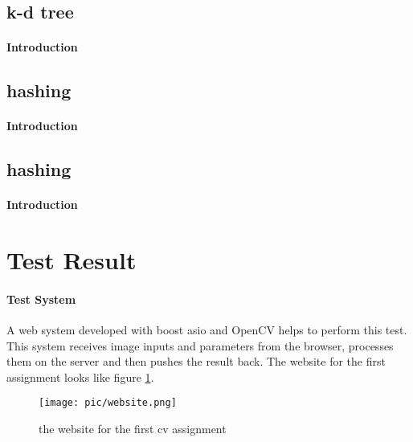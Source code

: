 \documentclass[paper=a4, fontsize=11pt]{scrartcl} %
\numberwithin{equation}{section} %
\numberwithin{figure}{section} %
\numberwithin{table}{section} %
\begin{document}
\subsection{k-d tree}
\paragraph{Introduction}

\subsection{hashing}
\paragraph{Introduction}

\subsection{hashing}
\paragraph{Introduction}


\section{Test Result}

\paragraph{Test System}
A web system developed with boost asio and OpenCV helps to perform this test. 
This system receives image inputs and parameters from the browser, processes them on the server and then pushes the result back.
The website for the first assignment looks like figure \ref{fig:website}.

\begin{figure}[htbp]
\centering
\texttt{[image: pic/website.png]}
\caption{the website for the first cv assignment}
\label{fig:website}
\end{figure}
\end{document}
